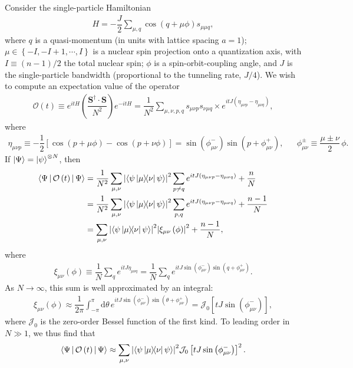 \documentclass[nofootinbib,notitlepage,11pt]{revtex4-2}
\newcommand{\f}[2]{\dfrac{#1}{#2}} %
\newcommand{\p}[1]{\left(#1\right)} %
\renewcommand{\sp}[1]{\left[#1\right]} %
\renewcommand{\set}[1]{\left\{#1\right\}} %
\newcommand{\bk}{\Braket} %
\renewcommand{\v}{\bm} %
\renewcommand{\c}{\cdot} %
\renewcommand{\dd}{\text{d}} %
\newcommand{\1}{\mathds{1}}
\newcommand{\J}{\mathcal{J}}
\renewcommand{\O}{\mathcal{O}}
\begin{document}
Consider the single-particle Hamiltonian
\begin{align}
  H = -\f{J}{2} \sum_{\mu,q} \cos\p{q + \mu\phi} s_{\mu\mu q},
\end{align}
where $q$ is a quasi-momentum (in units with lattice spacing $a=1$);
$\mu\in\set{-I,-I+1,\cdots,I}$ is a nuclear spin projection onto a
quantization axis, with $I\equiv\p{n-1}/2$ the total nuclear spin;
$\phi$ is a spin-orbit-coupling angle, and $J$ is the single-particle
bandwidth (proportional to the tunneling rate, $J/4$).  We wish to
compute an expectation value of the operator
\begin{align}
  \O\p{t}
  \equiv e^{it H} \p{\f{\v S^\dag \c\v S}{N^2}} e^{-it H}
  = \f1{N^2} \sum_{\mu,\nu,p,q} s_{\mu\nu p} s_{\nu\mu q} \times
  e^{itJ\p{\eta_{\mu\nu p}-\eta_{\mu\nu q}}},
\end{align}
where
\begin{align}
  \eta_{\mu\nu p}
  \equiv -\f12 \sp{\cos\p{p+\mu\phi} - \cos\p{p+\nu\phi}}
  = \sin\p{\phi_{\mu\nu}^-} \sin\p{p+\phi_{\mu\nu}^+},
  &&
  \phi_{\mu\nu}^\pm \equiv \f{\mu\pm\nu}{2}\,\phi.
\end{align}
If $\ket\Psi=\ket\psi^{\otimes N}$, then
\begin{align}
  \bk{\Psi|\O\p{t}|\Psi}
  &= \f1{N^2} \sum_{\mu,\nu} \abs{\bk{\psi\op{\mu}{\nu}\psi}}^2
  \sum_{p\ne q} e^{itJ\p{\eta_{\mu\nu p}-\eta_{\mu\nu q}}} + \f{n}{N} \\
  &= \f1{N^2} \sum_{\mu,\nu} \abs{\bk{\psi\op{\mu}{\nu}\psi}}^2
  \sum_{p,q} e^{itJ\p{\eta_{\mu\nu p}-\eta_{\mu\nu q}}} + \f{n-1}{N} \\
  &= \sum_{\mu,\nu} \abs{\bk{\psi\op{\mu}{\nu}\psi}}^2
  \abs{\xi_{\mu\nu}\p{\phi}}^2 + \f{n-1}{N},
\end{align}
where
\begin{align}
  \xi_{\mu\nu}\p{\phi} \equiv \f1N \sum_q e^{itJ\eta_{\mu\nu q}}
  = \f1N \sum_q e^{itJ\sin\p{\phi_{\mu\nu}^-} \sin\p{q+\phi_{\mu\nu}^+}}.
\end{align}
As $N\to\infty$, this sum is well approximated by an integral:
\begin{align}
  \xi_{\mu\nu}\p{\phi} \approx \f1{2\pi} \int_{-\pi}^\pi \dd\theta\,
  e^{itJ\sin\p{\phi_{\mu\nu}^-} \sin\p{\theta+\phi_{\mu\nu}^+}}
  = \J_0\sp{tJ\sin\p{\phi_{\mu\nu}^-}},
\end{align}
where $\J_0$ is the zero-order Bessel function of the first kind.  To
leading order in $N\gg1$, we thus find that
\begin{align}
  \bk{\Psi|\O\p{t}|\Psi}
  \approx \sum_{\mu,\nu} \abs{\bk{\psi\op{\mu}{\nu}\psi}}^2
  \J_0\sp{tJ\sin\p{\phi_{\mu\nu}^-}}^2.
  \label{eq:O_time}
\end{align}
\end{document}
